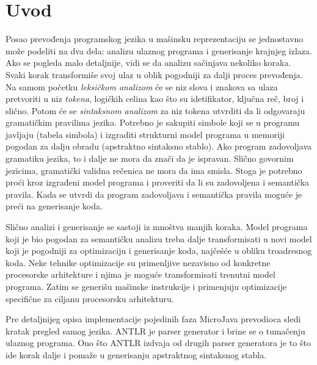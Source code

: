 \chapter{Uvod}

Posao prevođenja programskog jezika u mašinsku reprezentaciju se jednostavno može podeliti na dva dela: analizu ulaznog programa i generisanje krajnjeg izlaza\cite{dragon}. 
Ako se pogleda malo detaljnije, vidi se da analizu sačinjava nekoliko koraka. 
Svaki korak transformiše svoj ulaz u oblik pogodniji za dalji proces prevođenja. 
Na samom početku \emph{leksičkom analizom} će se niz slova i znakova sa ulaza pretvoriti u niz \emph{tokena}, logičkih celina kao što su idetifikator, ključna reč, broj i slično. 
Potom će se \emph{sintaksnom analizom} za niz tokena utvrditi da li odgovaraju gramatičkim pravilima jezika. 
Potrebno je sakupiti simbole koji se u programu javljaju (tabela simbola) i izgraditi strukturni model programa u memoriji pogodan za dalju obradu (apstraktno sintaksno stablo).
Ako program zadovoljava gramatiku jezika, to i dalje ne mora da znači da je ispravan.
Slično govornim jezicima, gramatički validna rečenica ne mora da ima smisla.
Stoga je potrebno proći kroz izgrađeni model programa i proveriti da li su zadovoljena i semantička pravila. 
Kada se utvrdi da program zadovoljava i semantička pravila moguće je preći na generisanje koda.

Slično analizi i generisanje se sastoji iz mnoštva manjih koraka.
Model programa koji je bio pogodan za semantičku analizu treba dalje transformisati u novi model koji je pogodniji za optimizaciju i generisanje koda, najčešće u obliku troadresnog koda.
Neke tehnike optimizacije su primenljive nezavisno od konkretne procesorske arhitekture i njima je moguće transformisati trenutni model programa.
Zatim se generišu mašinske instrukcije i primenjuju optimizacije specifične za ciljanu procesorsku arhitekturu.

Pre detaljnijeg opisa implementacije pojedinih faza MicroJava prevodioca sledi kratak pregled samog jezika. 
ANTLR je parser generator i brine se o tumačenju ulaznog programa.
Ono što ANTLR izdvaja od drugih parser generatora je to što ide korak dalje i pomaže u generisanju apstraktnog sintaksnog stabla.

